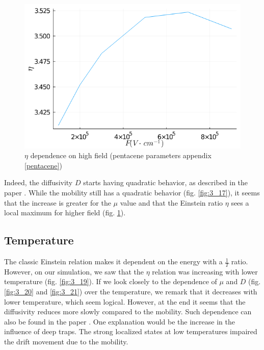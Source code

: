 \begin{figure}[!h]
    \centering
    \includegraphics*[width=.5\paperwidth]{figures/3_elec/ein_field_high.png}
    \caption{$\eta$ dependence on high field (pentacene parameters appendix \ref{pentacene})\label{fig:3_18}}
\end{figure}

Indeed, the diffusivity $D$ starts having quadratic behavior, as described in the paper \cite{general_einstein}. While the mobility still has a quadratic behavior (fig. \ref{fig:3_17}), it seems that the increase is greater for the $\mu$ value and that the Einstein ratio $\eta$ sees a local maximum for higher field (fig. \ref{fig:3_18}).

\subsection{Temperature}

The classic Einstein relation makes it dependent on the energy with a $\frac{1}{T}$ ratio. However, on our simulation, we saw that the $\eta$ relation was increasing with lower temperature (fig. \ref{fig:3_19}). If we look closely to the dependence of $\mu$ and $D$ (fig. \ref{fig:3_20} and \ref{fig:3_21}) over the temperature, we remark that it decreases with lower temperature, which seem logical. However, at the end it seems that the diffusivity reduces more slowly compared to the mobility. Such dependence can also be found in the paper \cite{general_einstein}. One explanation would be the increase in the influence of deep traps. The strong localized states at low temperatures impaired the drift movement due to the mobility.

